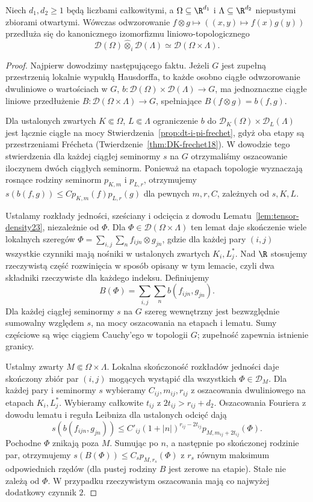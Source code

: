 \begin{twierdzenie}
\label{thm:D-i-product24}
Niech $d_1,d_2\ge1$ będą liczbami całkowitymi, a
$\Omega\subseteq\R^{d_1}$ i $\Lambda\subseteq\R^{d_2}$
niepustymi zbiorami otwartymi. Wówczas odwzorowanie
$f\otimes g\mapsto ((x,y)\mapsto f(x)g(y))$ przedłuża się
do kanonicznego izomorfizmu liniowo-topologicznego
\[
 \mathcal D(\Omega)\widehat\otimes_i\mathcal D(\Lambda)
 \simeq \mathcal D(\Omega\times\Lambda).
\]
\end{twierdzenie}
\begin{proof}
Najpierw dowodzimy następującego faktu. Jeżeli $G$ jest
zupełną przestrzenią lokalnie wypukłą Hausdorffa, to każde
osobno ciągłe odwzorowanie dwuliniowe o wartościach w $G$,
$b:\mathcal D(\Omega)\times\mathcal D(\Lambda)\to G$,
ma jednoznaczne ciągłe liniowe przedłużenie
$B:\mathcal D(\Omega\times\Lambda)\to G$, spełniające
$B(f\otimes g)=b(f,g)$.

Dla ustalonych zwartych $K\Subset\Omega$,
$L\Subset\Lambda$ ograniczenie $b$ do
$\mathcal D_K(\Omega)\times\mathcal D_L(\Lambda)$ jest
łącznie ciągłe na mocy Stwierdzenia~\ref{prop:dt-i-pi-frechet},
gdyż oba etapy są przestrzeniami Frécheta
(Twierdzenie~\ref{thm:DK-frechet18}).
W dowodzie tego stwierdzenia dla każdej ciągłej seminormy
$s$ na $G$ otrzymaliśmy oszacowanie iloczynem dwóch
ciągłych seminorm. Ponieważ na etapach topologie
wyznaczają rosnące rodziny seminorm $p_{K,m}$ i $p_{L,r}$,
otrzymujemy
$s(b(f,g))\le C p_{K,m}(f)p_{L,r}(g)$ dla pewnych
$m,r,C$, zależnych od $s,K,L$.

Ustalamy rozkłady jedności, sześciany i odcięcia
z dowodu Lematu~\ref{lem:tensor-density23}, niezależnie
od $\Phi$. Dla $\Phi\in\mathcal D(\Omega\times\Lambda)$
ten lemat daje skończenie wiele lokalnych szeregów
$\Phi=\sum_{i,j}\sum_n f_{ijn}\otimes g_{jn}$,
gdzie dla każdej pary $(i,j)$ wszystkie czynniki
mają nośniki w ustalonych zwartych $K_i,L_j^*$.
Nad $\R$ stosujemy rzeczywistą część rozwinięcia
w sposób opisany w tym lemacie, czyli dwa składniki
rzeczywiste dla każdego indeksu.
Definiujemy
\[
 B(\Phi)=\sum_{i,j}\sum_n b(f_{ijn},g_{jn}).
\]
Dla każdej ciągłej seminormy $s$ na $G$ szereg
wewnętrzny jest bezwzględnie sumowalny względem $s$,
na mocy oszacowania na etapach i lematu.
Sumy częściowe są więc ciągiem Cauchy'ego
w topologii $G$; zupełność zapewnia istnienie granicy.

Ustalmy zwarty $M\Subset\Omega\times\Lambda$.
Lokalna skończoność rozkładów jedności daje
skończony zbiór par $(i,j)$ mogących wystąpić
dla wszystkich $\Phi\in\mathcal D_M$.
Dla każdej pary i seminormy $s$ wybieramy
$C_{ij},m_{ij},r_{ij}$ z oszacowania dwuliniowego
na etapach $K_i,L_j^*$. Wybieramy całkowite
$t_{ij}$ z $2t_{ij}>r_{ij}+d_2$.
Oszacowania Fouriera z dowodu lematu i reguła
Leibniza dla ustalonych odcięć dają
\[
 s(b(f_{ijn},g_{jn}))\le C'_{ij}
 (1+|n|)^{r_{ij}-2t_{ij}}
 p_{M,m_{ij}+2t_{ij}}(\Phi).
\]
Pochodne $\Phi$ znikają poza $M$.
Sumując po $n$, a następnie po skończonej rodzinie
par, otrzymujemy $s(B(\Phi))\le C_s p_{M,r_s}(\Phi)$
z $r_s$ równym maksimum odpowiednich rzędów
(dla pustej rodziny $B$ jest zerowe na etapie).
Stałe nie zależą od $\Phi$. W przypadku rzeczywistym
oszacowania mają co najwyżej dodatkowy czynnik $2$.


\end{proof}
